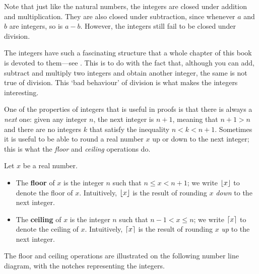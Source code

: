 Note that just like the natural numbers, the integers are closed under addition and multiplication. They are also closed under subtraction, since whenever $a$ and $b$ are integers, so is $a-b$. However, the integers still fail to be closed under division.

The integers have such a fascinating structure that a whole chapter of this book is devoted to them---see . This is to do with the fact that, although you can add, subtract and multiply two integers and obtain another integer, the same is not true of division. This `bad behaviour' of division is what makes the integers interesting.

One of the properties of integers that is useful in proofs is that there is always a \textit{next} one: given any integer $n$, the next integer is $n+1$, meaning that $n+1>n$ and there are no integers $k$ that satisfy the inequality $n<k<n+1$. Sometimes it is useful to be able to round a real number $x$ up or down to the next integer; this is what the \textit{floor} and \textit{ceiling} operations do.


\begin{definition}
Let $x$ be a real number.
\begin{itemize}
\item The \textbf{floor} of $x$ is the integer $n$ such that $n \le x < n+1$; we write $\lfloor {x} \rfloor$ to denote the floor of $x$. Intuitively, $\lfloor {x} \rfloor$ is the result of rounding $x$ \textit{down} to the next integer.
\item The \textbf{ceiling} of $x$ is the integer $n$ such that $n-1 < x \le n$; we write $\lceil {x} \rceil$ to denote the ceiling of $x$. Intuitively, $\lceil {x} \rceil$ is the result of rounding $x$ \textit{up} to the next integer.
\end{itemize}

The floor and ceiling operations are illustrated on the following number line diagram, with the notches representing the integers.
\begin{center}
\end{center}
\end{definition}

